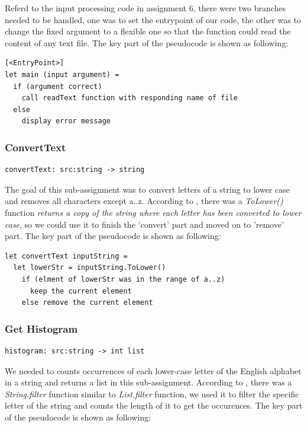 \documentclass{article}
\begin{document}
Referd to the input processing code in assignment 6, there were two branches needed to be handled, one was to set the entrypoint of our code, the other was to change the fixed argument to a flexible one so that the function could read the content of any text file. The key part of the pseudocode is shown as following:

\begin{lstlisting}
[<EntryPoint>]
let main (input argument) = 
  if (argument correct)
    call readText function with responding name of file    
  else
    display error message
\end{lstlisting}

\subsubsection{ConvertText}
\begin{lstlisting}
convertText: src:string -> string
\end{lstlisting}

The goal of this sub-assignment was to convert letters of a string to lower case and removes all characters except a..z. 
According to \cite{sporring2019}, there was a \emph{ToLower()} function \emph{returns a copy of the string where each letter has been converted to lower case}, so we could use it to finish the 'convert' part and moved on to 'remove' part. The key part of the pseudocode is shown as following:

\begin{lstlisting}
let convertText inputString = 
  let lowerStr = inputString.ToLower()
    if (elment of lowerStr was in the range of a..z)
      keep the current element
    else remove the current element  
\end{lstlisting}

\subsubsection{Get Histogram}
\begin{lstlisting}
histogram: src:string -> int list
\end{lstlisting}

We needed to counts occurrences of each lower-case letter of the English alphabet in a string and returns a list in this sub-assignment. According to \cite{sporring2019}, there was a \emph{String.filter} function similar to \emph{List.filter} function, we used it to filter the specific letter of the string and counts the length of it to get the occurences. The key part of the pseudocode is shown as following:
\end{document}
